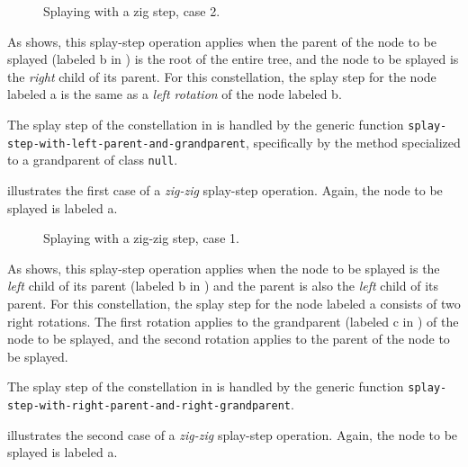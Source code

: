 \begin{figure}
\begin{center}
\end{center}
\caption{\label{fig-splay-zig-2}
Splaying with a zig step, case 2.}
\end{figure}

As  shows, this splay-step operation applies
when the parent of the node to be splayed (labeled \textsf{b} in
) is the root of the entire tree, and the node
to be splayed is the \emph{right} child of its parent.  For this
constellation, the splay step for the node labeled \textsf{a} is the
same as a \emph{left rotation} of the node labeled \textsf{b}.

The splay step of the constellation in  is
handled by the generic function
\texttt{splay-step-with-left-parent-and-grandparent}, specifically by
the method specialized to a grandparent of class \texttt{null}.

 illustrates the first case of a
\emph{zig-zig} splay-step operation.  Again, the node to be splayed is
labeled \textsf{a}.

\begin{figure}
\begin{center}
\end{center}
\caption{\label{fig-splay-zig-zig-1}
Splaying with a zig-zig step, case 1.}
\end{figure}

As  shows, this splay-step operation
applies when the node to be splayed is the \emph{left} child of its
parent (labeled \textsf{b} in ) and the
parent is also the \emph{left} child of its parent.  For this
constellation, the splay step for the node labeled \textsf{a} consists
of two right rotations.  The first rotation applies to the grandparent
(labeled \textsf{c} in ) of the node to be
splayed, and the second rotation applies to the parent of the node to
be splayed.

The splay step of the constellation in  is
handled by the generic function
\texttt{splay-step-with-right-parent-and-right-grandparent}.

 illustrates the second case of a
\emph{zig-zig} splay-step operation.  Again, the node to be splayed is
labeled \textsf{a}.

